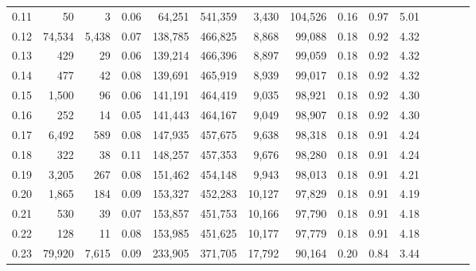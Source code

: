 \begin{tabular}{rrrcrrrrrrrrrrr}
0.11 &      50 &       3 &                                       0.06 &   64,251 &  541,359 &    3,430 &  104,526 &  0.16 &  0.97 &                         5.01 \\
0.12 &  74,534 &   5,438 &                                       0.07 &  138,785 &  466,825 &    8,868 &   99,088 &  0.18 &  0.92 &                         4.32 \\
0.13 &     429 &      29 &                                       0.06 &  139,214 &  466,396 &    8,897 &   99,059 &  0.18 &  0.92 &                         4.32 \\
0.14 &     477 &      42 &                                       0.08 &  139,691 &  465,919 &    8,939 &   99,017 &  0.18 &  0.92 &                         4.32 \\
0.15 &   1,500 &      96 &                                       0.06 &  141,191 &  464,419 &    9,035 &   98,921 &  0.18 &  0.92 &                         4.30 \\
0.16 &     252 &      14 &                                       0.05 &  141,443 &  464,167 &    9,049 &   98,907 &  0.18 &  0.92 &                         4.30 \\
0.17 &   6,492 &     589 &                                       0.08 &  147,935 &  457,675 &    9,638 &   98,318 &  0.18 &  0.91 &                         4.24 \\
0.18 &     322 &      38 &                                       0.11 &  148,257 &  457,353 &    9,676 &   98,280 &  0.18 &  0.91 &                         4.24 \\
0.19 &   3,205 &     267 &                                       0.08 &  151,462 &  454,148 &    9,943 &   98,013 &  0.18 &  0.91 &                         4.21 \\
0.20 &   1,865 &     184 &                                       0.09 &  153,327 &  452,283 &   10,127 &   97,829 &  0.18 &  0.91 &                         4.19 \\
0.21 &     530 &      39 &                                       0.07 &  153,857 &  451,753 &   10,166 &   97,790 &  0.18 &  0.91 &                         4.18 \\
0.22 &     128 &      11 &                                       0.08 &  153,985 &  451,625 &   10,177 &   97,779 &  0.18 &  0.91 &                         4.18 \\
0.23 &  79,920 &   7,615 &                                       0.09 &  233,905 &  371,705 &   17,792 &   90,164 &  0.20 &  0.84 &                         3.44 \\

\end{tabular}
